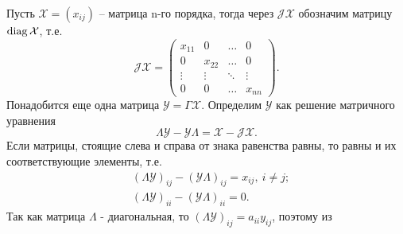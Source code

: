 Пусть $\mathcal{X} = (x_{ij})$ -- матрица n-го порядка, тогда через $\mathcal{JX}$ обозначим матрицу $\operatorname{diag}\mathcal{X}$, т.е.
$$
\mathcal{JX} = \begin{pmatrix}
x_{11} &   0    & \dots  &   0    \\
  0    & x_{22} & \dots  &   0    \\
\vdots & \vdots & \ddots & \vdots \\
  0    &   0    & \dots  & x_{nn}
\end{pmatrix}.
$$
Понадобится еще одна матрица $\mathcal{Y} = \Gamma\mathcal{X}$. Определим $\mathcal{Y}$ как решение матричного уравнения
$$
\Lambda\mathcal{Y} - \mathcal{Y}\Lambda = \mathcal{X} - \mathcal{JX}.
$$
Если матрицы, стоящие слева и справа от знака равенства равны, то равны и их соответствующие элементы, т.е.
\begin{align*}
&(\Lambda\mathcal{Y})_{ij} - (\mathcal{Y}\Lambda)_{ij} = x_{ij},\ i \ne j; \\
&(\Lambda\mathcal{Y})_{ii} - (\mathcal{Y}\Lambda)_{ii} = 0.
\end{align*}
Так как матрица $\Lambda$ - диагональная, то $(\Lambda\mathcal{Y})_{ij} = a_{ii}y_{ij}$, поэтому из 